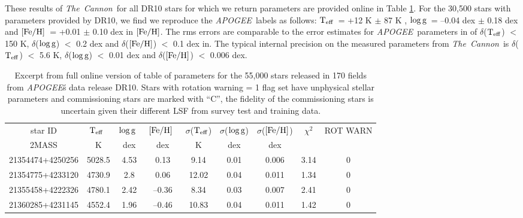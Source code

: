 \documentclass[12pt, preprint]{aastex}
\newcommand{\teff}{\mbox{$\rm T_{eff}$}}
\newcommand{\feh}{\mbox{$\rm [Fe/H]$}}
\newcommand{\logg}{\mbox{$\rm \log g$}}
\newcommand{\tc}{\textsl{The~Cannon}}
\newcommand{\apogee}{\textsl{APOGEE}}
\begin{document}
These results of \tc\ for all DR10 stars for which we return parameters are provided online in Table \ref{tab:online}. 
For the 30,500 stars with parameters provided by DR10, we find we reproduce the \apogee\ labels as follows: 
\teff\ = +12 K $\pm$ 87 K , \logg\ = --0.04 dex $\pm$ 0.18 dex and \feh\ = +0.01 $\pm$ 0.10 dex in \feh. 
The rms errors are comparable to the error estimates for \apogee\ parameters in \citet{Meszaros2013} 
of $\delta$(\teff) $<$ 150 K, $\delta$(\logg) $<$ 0.2 dex and $\delta$(\feh) $<$ 0.1 dex in. 
The typical internal precision on the measured parameters from \tc\ is $\delta$(\teff) $<$ 5.6 K, $\delta$(\logg) $<$ 0.01 dex and $\delta$(\feh) $<$ 0.006 dex.

\begin{table}[!h]
\small{
\centering
\caption{Excerpt from full online version of table of parameters for the 55,000 stars released in 170 fields from \apogee\'s data release DR10. Stars with rotation warning = 1 flag set have unphysical stellar parameters and commissioning stars are marked with ``C'', the fidelity of the commissioning stars is uncertain given their different LSF from survey test and training data.} \begin{tabular}{| c | c | c |  c | c | c |  c | c | c |} %
\hline
star ID & \teff\ & \logg\ & \feh\ & $\sigma$(\teff) & $\sigma$(\logg) & $\sigma$(\feh) & $\chi^2$ & \tiny{ROT WARN}\\
{2MASS} &  K &  dex  & dex & K & dex & dex & & \\    
\hline
21354474+4250256 & 5028.5 & 4.53 & 0.13 & 9.14 & 0.01 & 0.006 & 3.14 & 0\\
21354775+4233120 & 4730.9 & 2.8 & 0.06 & 12.02 & 0.04 & 0.011 & 1.34 & 0\\
21355458+4222326 & 4780.1 & 2.42 & --0.36 & 8.34 & 0.03 & 0.007 & 2.41 & 0\\
21360285+4231145 &  4552.4 &  1.96 & --0.46  & 10.83 & 0.04 & 0.011 &  1.42 &  0\\
 \hline
\end{tabular}
\label{tab:online} }
\end{table}  
 
\end{document}
